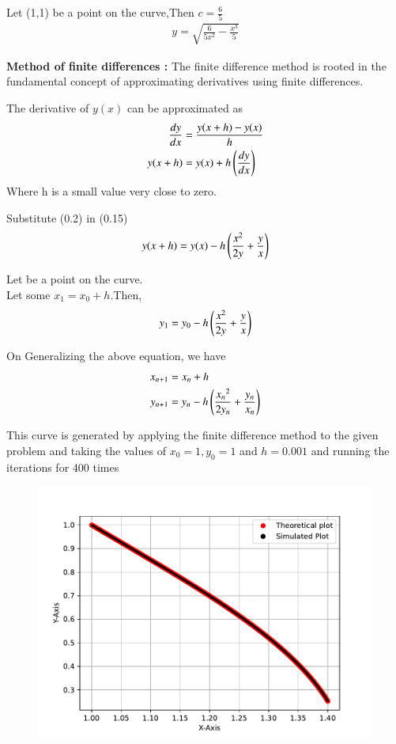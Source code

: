 \documentclass[journal]{IEEEtran}
\begin{document}
Let (1,1) be a point on the curve,Then $c=\frac{6}{5}$
\begin{align}
    y=\sqrt{\frac{6}{5{x^2}}-\frac{x^3}{5}}
\end{align}

\textbf{Method of finite differences :}
The finite difference method is rooted in the fundamental concept of approximating derivatives using finite differences.

The derivative of $y(x)$ can be approximated as 
\begin{align}
    \frac{dy}{dx}&=\frac{y(x+h)-y(x)}{h}\\
    y(x+h)&=y(x)+h\left(\frac{dy}{dx}\right)
\end{align}
Where h is a small value very close to zero.

Substitute (0.2) in (0.15)
\begin{align}
    y(x+h)=y(x)-h \left(\frac{x^2}{2y}+\frac{y}{x}\right)
\end{align}

Let  be a point on the curve.\\
Let some $x_1=x_0 +h$.Then,
\begin{align}
    y_1 = y_0-h \left(\frac{x^2}{2y}+\frac{y}{x}\right)
\end{align}

On Generalizing the above equation, we have 
\begin{align}
    x_{n+1}&=x_{n} +h \\
    y_{n+1}&=y_{n}-h \left(\frac{{x_n}^2}{2{y_n}}+\frac{y_n}{x_n}\right) 
\end{align}

This curve is generated by applying the finite difference method to the given problem and taking the values of $x_0=1,y_0=1$ and $h=0.001$ and running the iterations for 400 times 
\begin{figure}[h]
   \centering
   \includegraphics[width=\columnwidth]{figs/fig.pdf}
\end{figure}
\end{document}
